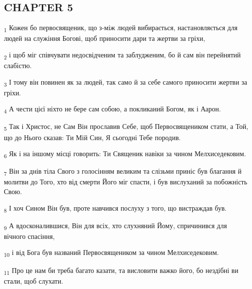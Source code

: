 \subsection{CHAPTER 5}
\begin{tcolorbox}
\textsubscript{1} Кожен бо первосвященик, що з-між людей вибирається, настановляється для людей на служіння Богові, щоб приносити дари та жертви за гріхи,
\end{tcolorbox}
\begin{tcolorbox}
\textsubscript{2} і щоб міг співчувати недосвідченим та заблудженим, бо й сам він перейнятий слабістю.
\end{tcolorbox}
\begin{tcolorbox}
\textsubscript{3} І тому він повинен як за людей, так само й за себе самого приносити жертви за гріхи.
\end{tcolorbox}
\begin{tcolorbox}
\textsubscript{4} А чести цієї ніхто не бере сам собою, а покликаний Богом, як і Аарон.
\end{tcolorbox}
\begin{tcolorbox}
\textsubscript{5} Так і Христос, не Сам Він прославив Себе, щоб Первосвящеником стати, а Той, що до Нього сказав: Ти Мій Син, Я сьогодні Тебе породив.
\end{tcolorbox}
\begin{tcolorbox}
\textsubscript{6} Як і на іншому місці говорить: Ти Священик навіки за чином Мелхиседековим.
\end{tcolorbox}
\begin{tcolorbox}
\textsubscript{7} Він за днів тіла Свого з голосінням великим та слізьми приніс був благання й молитви до Того, хто від смерти Його міг спасти, і був вислуханий за побожність Свою.
\end{tcolorbox}
\begin{tcolorbox}
\textsubscript{8} І хоч Сином Він був, проте навчився послуху з того, що вистраждав був.
\end{tcolorbox}
\begin{tcolorbox}
\textsubscript{9} А вдосконалившися, Він для всіх, хто слухняний Йому, спричинився для вічного спасіння,
\end{tcolorbox}
\begin{tcolorbox}
\textsubscript{10} і від Бога був названий Первосвящеником за чином Мелхиседековим.
\end{tcolorbox}
\begin{tcolorbox}
\textsubscript{11} Про це нам би треба багато казати, та висловити важко його, бо нездібні ви стали, щоб слухати.
\end{tcolorbox}
